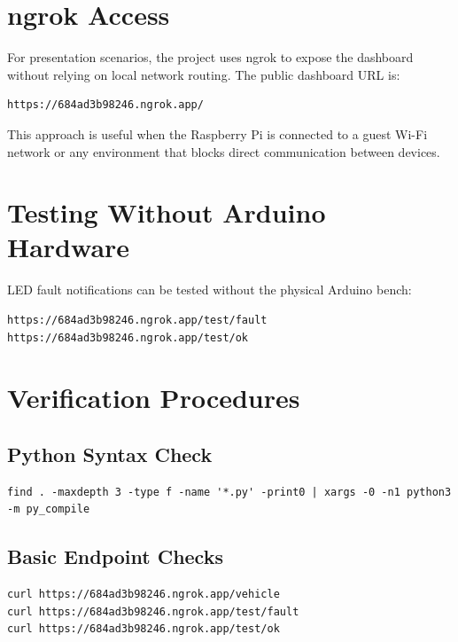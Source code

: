 \documentclass[a4paper,10pt,titlepage,oneside]{article}
\begin{document}
\section{ngrok Access}

For presentation scenarios, the project uses ngrok to expose the dashboard
without relying on local network routing. The public dashboard URL is:

\begin{lstlisting}
https://684ad3b98246.ngrok.app/
\end{lstlisting}

This approach is useful when the Raspberry Pi is connected to a guest Wi-Fi
network or any environment that blocks direct communication between devices.

\section{Testing Without Arduino Hardware}

LED fault notifications can be tested without the physical Arduino bench:

\begin{lstlisting}
https://684ad3b98246.ngrok.app/test/fault
https://684ad3b98246.ngrok.app/test/ok
\end{lstlisting}

\section{Verification Procedures}

\subsection{Python Syntax Check}

\begin{lstlisting}
find . -maxdepth 3 -type f -name '*.py' -print0 | xargs -0 -n1 python3 -m py_compile
\end{lstlisting}

\subsection{Basic Endpoint Checks}

\begin{lstlisting}
curl https://684ad3b98246.ngrok.app/vehicle
curl https://684ad3b98246.ngrok.app/test/fault
curl https://684ad3b98246.ngrok.app/test/ok
\end{lstlisting}
\end{document}
